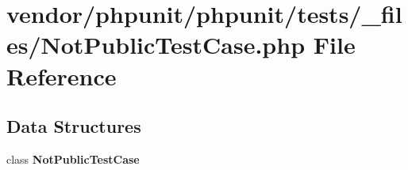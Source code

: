\section{vendor/phpunit/phpunit/tests/\+\_\+files/\+Not\+Public\+Test\+Case.php File Reference}
\label{_not_public_test_case_8php}
\subsection*{Data Structures}
\begin{DoxyCompactItemize}
\item 
class {\bf Not\+Public\+Test\+Case}
\end{DoxyCompactItemize}
